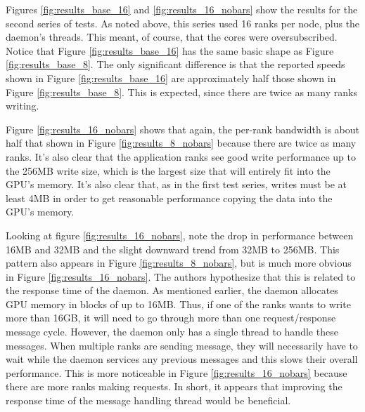 
Figures \ref{fig:results_base_16} and \ref{fig:results_16_nobars} show the results for the second series of tests.  As noted above, this series used 16 ranks per node, plus the daemon's threads.  This meant, of course, that the cores were oversubscribed.  Notice that Figure \ref{fig:results_base_16} has the same basic shape as Figure \ref{fig:results_base_8}.  The only significant difference is that the reported speeds shown in Figure \ref{fig:results_base_16} are approximately half those shown in Figure \ref{fig:results_base_8}.  This is expected, since there are twice as many ranks writing.

Figure \ref{fig:results_16_nobars} shows that again, the per-rank bandwidth is about half that shown in Figure \ref{fig:results_8_nobars} because there are twice as many ranks.  It's also clear that the application ranks see good write performance up to the 256MB write size, which is the largest size that will entirely fit into the GPU's memory.  It's also clear that, as in the first test series, writes must be at least 4MB in order to get reasonable performance copying the data into the GPU's memory.


Looking at figure \ref{fig:results_16_nobars}, note the drop in performance between 16MB and 32MB and the slight downward trend from 32MB to 256MB.  This pattern also appears in Figure \ref{fig:results_8_nobars}, but is much more obvious in Figure 
\ref{fig:results_16_nobars}.  The authors hypothesize that this is related to the response time of the daemon.  As mentioned earlier, the daemon allocates GPU memory in blocks of up to 16MB.  Thus, if one of the ranks wants to write more than 16GB, it will need to go through more than one request/response message cycle.  However, the daemon only has a single thread to handle these messages.  When multiple ranks are sending message, they will necessarily have to wait while the daemon services any previous messages and this slows their overall performance.  This is more noticeable in Figure 
\ref{fig:results_16_nobars} because there are more ranks making requests.
In short, it appears that improving the response time of the message handling thread would be beneficial.
